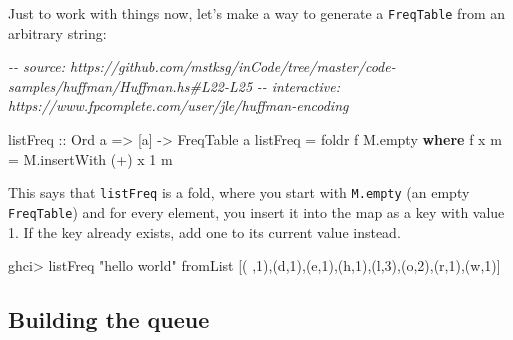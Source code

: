 \documentclass[]{article}
\newenvironment{Shaded}{}{}
\newcommand{\CharTok}[1]{\textcolor[rgb]{0.25,0.44,0.63}{#1}}
\newcommand{\CommentTok}[1]{\textcolor[rgb]{0.38,0.63,0.69}{\textit{#1}}}
\newcommand{\DataTypeTok}[1]{\textcolor[rgb]{0.56,0.13,0.00}{#1}}
\newcommand{\DecValTok}[1]{\textcolor[rgb]{0.25,0.63,0.44}{#1}}
\newcommand{\FunctionTok}[1]{\textcolor[rgb]{0.02,0.16,0.49}{#1}}
\newcommand{\KeywordTok}[1]{\textcolor[rgb]{0.00,0.44,0.13}{\textbf{#1}}}
\newcommand{\NormalTok}[1]{#1}
\newcommand{\OperatorTok}[1]{\textcolor[rgb]{0.40,0.40,0.40}{#1}}
\newcommand{\OtherTok}[1]{\textcolor[rgb]{0.00,0.44,0.13}{#1}}
\newcommand{\StringTok}[1]{\textcolor[rgb]{0.25,0.44,0.63}{#1}}
\begin{document}
Just to work with things now, let's make a way to generate a \texttt{FreqTable}
from an arbitrary string:

\begin{Shaded}
\begin{Highlighting}[]
\CommentTok{{-}{-} source: https://github.com/mstksg/inCode/tree/master/code{-}samples/huffman/Huffman.hs\#L22{-}L25}
\CommentTok{{-}{-} interactive: https://www.fpcomplete.com/user/jle/huffman{-}encoding}

\OtherTok{listFreq ::} \DataTypeTok{Ord}\NormalTok{ a }\OtherTok{=>}\NormalTok{ [a] }\OtherTok{{-}>} \DataTypeTok{FreqTable}\NormalTok{ a}
\NormalTok{listFreq }\OtherTok{=} \FunctionTok{foldr}\NormalTok{ f M.empty}
  \KeywordTok{where}
\NormalTok{    f x m }\OtherTok{=}\NormalTok{ M.insertWith (}\OperatorTok{+}\NormalTok{) x }\DecValTok{1}\NormalTok{ m}
\end{Highlighting}
\end{Shaded}

This says that \texttt{listFreq} is a fold, where you start with
\texttt{M.empty} (an empty \texttt{FreqTable}) and for every element, you insert
it into the map as a key with value 1. If the key already exists, add one to its
current value instead.

\begin{Shaded}
\begin{Highlighting}[]
\NormalTok{ghci}\OperatorTok{>}\NormalTok{ listFreq }\StringTok{"hello world"}
\NormalTok{fromList [(}\CharTok{\textquotesingle{} \textquotesingle{}}\NormalTok{,}\DecValTok{1}\NormalTok{),(}\CharTok{\textquotesingle{}d\textquotesingle{}}\NormalTok{,}\DecValTok{1}\NormalTok{),(}\CharTok{\textquotesingle{}e\textquotesingle{}}\NormalTok{,}\DecValTok{1}\NormalTok{),(}\CharTok{\textquotesingle{}h\textquotesingle{}}\NormalTok{,}\DecValTok{1}\NormalTok{),(}\CharTok{\textquotesingle{}l\textquotesingle{}}\NormalTok{,}\DecValTok{3}\NormalTok{),(}\CharTok{\textquotesingle{}o\textquotesingle{}}\NormalTok{,}\DecValTok{2}\NormalTok{),(}\CharTok{\textquotesingle{}r\textquotesingle{}}\NormalTok{,}\DecValTok{1}\NormalTok{),(}\CharTok{\textquotesingle{}w\textquotesingle{}}\NormalTok{,}\DecValTok{1}\NormalTok{)]}
\end{Highlighting}
\end{Shaded}

\hypertarget{building-the-queue}{%
\subsection{Building the queue}\label{building-the-queue}}
\end{document}
